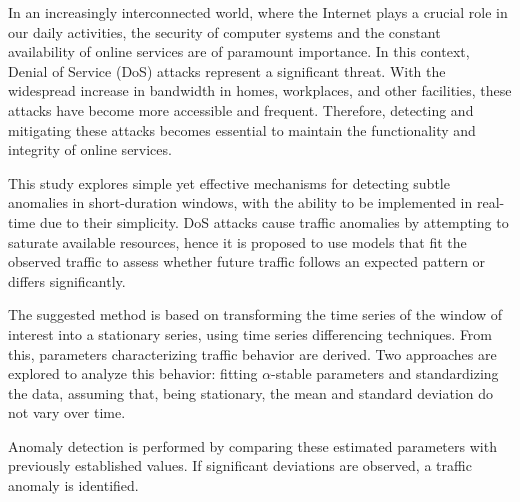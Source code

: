 In an increasingly interconnected world, where the Internet plays a crucial role in our daily activities, the security of computer systems and the constant availability of online services are of paramount importance. In this context, Denial of Service (DoS) attacks represent a significant threat. With the widespread increase in bandwidth in homes, workplaces, and other facilities, these attacks have become more accessible and frequent.
Therefore, detecting and mitigating these attacks becomes essential to maintain the functionality and integrity of online services.

This study explores simple yet effective mechanisms for detecting subtle anomalies in short-duration windows, with the ability to be implemented in real-time due to their simplicity. DoS attacks cause traffic anomalies by attempting to saturate available resources, hence it is proposed to use models that fit the observed traffic to assess whether future traffic follows an expected pattern or differs significantly.

The suggested method is based on transforming the time series of the window of interest into a stationary series, using time series differencing techniques. From this, parameters characterizing traffic behavior are derived. Two approaches are explored to analyze this behavior: fitting $\alpha$-stable parameters and standardizing the data, assuming that, being stationary, the mean and standard deviation do not vary over time.

Anomaly detection is performed by comparing these estimated parameters with previously established values. If significant deviations are observed, a traffic anomaly is identified.

